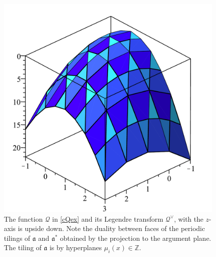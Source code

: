 \documentclass[14pt]{extarticle}
\newcommand{\Z}{\mathbb{Z}}
\newcommand{\cQ}{\mathscr{Q}}
\newcommand{\fa}{\mathfrak{a}}
\theoremstyle{definition}
\begin{document}
\begin{figure}[!h]
  \centering
  \includegraphics[scale=0.4]{ese_note_figure2.pdf}
  \hspace{0.5cm}
 \caption{The function $\cQ$ in \eqref{cQex} and its Legendre
   transform $\cQ^\vee$, with the $z$-axis is upside down. Note the
   duality between faces of the periodic tilings of $\fa$ and $\fa^*$ obtained by
   the projection to the argument plane. The tiling of $\fa$ is by
   hyperplanes $\mu_i(x) \in \Z$.}
\label{f2}
\end{figure}
%
%
\end{document}
